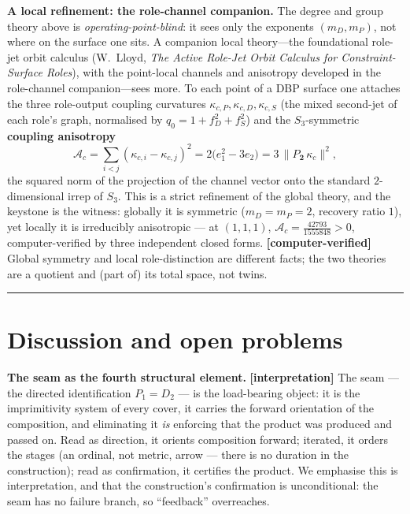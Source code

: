 \documentclass[11pt]{article}
\theoremstyle{plain}
\theoremstyle{definition}
\theoremstyle{remark}
\begin{document}
\textbf{A local refinement: the role-channel companion.} The degree and group theory above is \emph{operating-point-blind}: it sees only the exponents \((m_D,m_P)\), not where on the surface one sits. A companion local theory---the foundational role-jet orbit calculus (W.~Lloyd, \emph{The Active Role-Jet Orbit Calculus for Constraint-Surface Roles}), with the point-local channels and anisotropy developed in the role-channel companion---sees more. To each point of a DBP surface one attaches the three role-output coupling curvatures \(\kappa_{c,P}, \kappa_{c,D}, \kappa_{c,S}\) (the mixed second-jet of each role's graph, normalised by \(q_0 = 1 + f_D^2 + f_S^2\)) and the \(S_3\)-symmetric \textbf{coupling anisotropy} \[
\mathcal A_c = \sum_{i<j}(\kappa_{c,i} - \kappa_{c,j})^2 = 2\big(e_1^2 - 3e_2\big) = 3\,\big\|P_{\mathbf 2}\,\kappa_c\big\|^2,
\] the squared norm of the projection of the channel vector onto the standard \(2\)-dimensional irrep of \(S_3\). This is a strict refinement of the global theory, and the keystone is the witness: globally it is symmetric (\(m_D=m_P=2\), recovery ratio \(1\)), yet locally it is irreducibly anisotropic --- at \((1,1,1)\), \(\mathcal A_c = \tfrac{42793}{1555848} > 0\), computer-verified by three independent closed forms. \textbf{{[}computer-verified{]}} Global symmetry and local role-distinction are different facts; the two theories are a quotient and (part of) its total space, not twins.

\begin{center}\rule{0.5\linewidth}{0.5pt}\end{center}

\hypertarget{discussion-and-open-problems}{%
\section{Discussion and open problems}\label{discussion-and-open-problems}}

\textbf{The seam as the fourth structural element.} \textbf{{[}interpretation{]}} The seam --- the directed identification \(P_1 = D_2\) --- is the load-bearing object: it is the imprimitivity system of every cover, it carries the forward orientation of the composition, and eliminating it \emph{is} enforcing that the product was produced and passed on. Read as direction, it orients composition forward; iterated, it orders the stages (an ordinal, not metric, arrow --- there is no duration in the construction); read as confirmation, it certifies the product. We emphasise this is interpretation, and that the construction's confirmation is unconditional: the seam has no failure branch, so ``feedback'' overreaches.
\end{document}
